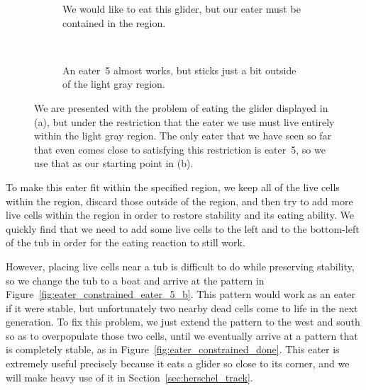 \begin{figure}[!htb]
	\centering
	\begin{subfigure}{.47\textwidth}
		\centering
		\caption{We would like to eat this glider, but our eater must be contained in the  region.}
		\label{fig:eater_constrained_pre}
	\end{subfigure} \quad \ %
	\begin{subfigure}{.47\textwidth}
		\centering
		\caption{An eater~5 almost works, but sticks just a bit outside of the light gray region.}
		\label{fig:eater_constrained_eater_5}
	\end{subfigure}
	\caption{We are presented with the problem of eating the glider displayed in (a), but under the restriction that the eater we use must live entirely within the light gray region. The only eater that we have seen so far that even comes close to satisfying this restriction is eater~5, so we use that as our starting point in (b).}\label{fig:eater_constrained_eater_5_first}
\end{figure}

To make this eater fit within the specified region, we keep all of the live cells within the region, discard those outside of the region, and then try to add more live cells within the region in order to restore stability and its eating ability. We quickly find that we need to add some live cells to the left and to the bottom-left of the tub in order for the eating reaction to still work.

However, placing live cells near a tub is difficult to do while preserving stability, so we change the tub to a boat and arrive at the pattern in Figure~\ref{fig:eater_constrained_eater_5_b}. This pattern would work as an eater if it were stable, but unfortunately two nearby dead cells come to life in the next generation. To fix this problem, we just extend the pattern to the west and south so as to overpopulate those two cells, until we eventually arrive at a pattern that is completely stable, as in Figure~\ref{fig:eater_constrained_done}. This eater is extremely useful precisely because it eats a glider so close to its corner, and we will make heavy use of it in Section~\ref{sec:herschel_track}.

